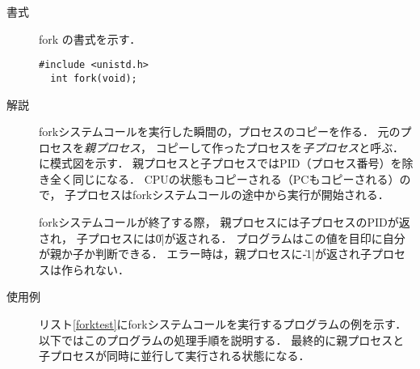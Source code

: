 \begin{description}
\item[書式] fork の書式を示す．
\begin{lstlisting}[numbers=none]
  #include <unistd.h>
  int fork(void);
\end{lstlisting}

\item[解説] forkシステムコールを実行した瞬間の，プロセスのコピーを作る．
  元のプロセスを\emph{親プロセス}，
  コピーして作ったプロセスを\emph{子プロセス}と呼ぶ．
  に模式図を示す．
  親プロセスと子プロセスではPID（プロセス番号）を除き全く同じになる．
  CPUの状態もコピーされる（PCもコピーされる）ので，
  子プロセスはforkシステムコールの途中から実行が開始される．


  forkシステムコールが終了する際，
  親プロセスには子プロセスのPIDが返され，
  子プロセスには\|0|が返される．
  プログラムはこの値を目印に自分が親か子か判断できる．
  エラー時は，親プロセスに\|-1|が返され子プロセスは作られない．

\item[使用例]
  リスト\ref{forktest}にforkシステムコールを実行するプログラムの例を示す．
  以下ではこのプログラムの処理手順を説明する．
  最終的に親プロセスと子プロセスが同時に並行して実行される状態になる．

  
  

\end{description}
